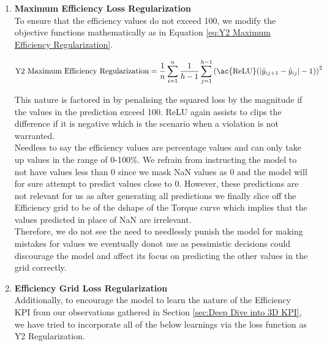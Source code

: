 \documentclass{report} %
\begin{document}
\begin{enumerate}

\item \textbf{Maximum Efficiency Loss Regularization} \\

To ensure that the efficiency values do not exceed 100, we modify the objective functions mathematically as in Equation \ref{eq:Y2 Maximum Efficiency Regularization}.

\begin{equation}
\text{Y2 Maximum Efficiency Regularization} = \frac{1}{n} \sum_{i=1}^{n}\frac{1}{h-1} \sum_{j=1}^{h-1} \left(\text{\ac{ReLU}}(|\hat{y}_{i{j+1}} - \hat{y}_{ij}| - 1)\right)^2 
\label{eq:Y2 Maximum Efficiency Regularization}
\end{equation} 

\vspace{0.2cm} %
This nature is factored in by penalising the squared loss by the magnitude if the values in the prediction exceed 100.
\ac{ReLU} again assists to clips the difference if it is negative which is the scenario when a violation is not warranted. \\

Needless to say the efficiency values are percentage values and can only take up values in the range of 0-100\%.
We refrain from instructing the model to not have values less than 0 since we mask \ac{NaN} values as 0 and the model will for sure attempt to predict values close to 0.
However, these predictions are not relevant for us as after generating all predictions we finally slice off the Efficiency grid to be of the dshape of the Torque curve which 
implies that the values predicted in place of \ac{NaN} are irrelevant.\\
Therefore, we do not see the need to needlessly punish the model for making mistakes for values we eventually donot use as pessimistic decisions could discourage the model 
and affect its focus on predicting the other values in the grid correctly.\\  

\item \textbf{Efficiency Grid Loss Regularization} \\

Additionally, to encourage the model to learn the nature of the Efficiency \ac{KPI} from our observations gathered in Section \ref{sec:Deep Dive into 3D KPI}, we have tried to incorporate all of the below learnings via the loss function as Y2 Regularization.\\


\end{enumerate}
\end{document}
